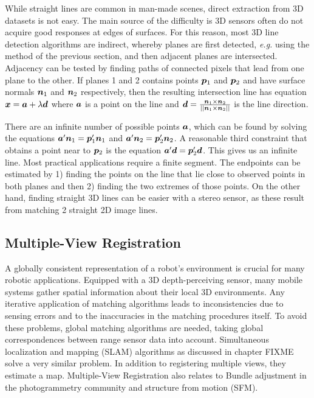 \documentclass[twocolumn,oneside]{book}
\newcommand{\V}[1]{\vector{#1}}  %
\begin{document}
\begin{itemize}
  While straight lines are common in man-made scenes, direct
  extraction from 3D datasets is not easy.  The main source of the
  difficulty is 3D sensors often do not acquire good responses at
  edges of surfaces.
%
  For this reason, most 3D line detection algorithms are indirect,
  whereby planes are first detected, {\it e.g.} using the method of
  the previous section, and then adjacent planes are intersected.
  Adjacency can be tested by finding paths of connected pixels that
  lead from one plane to the other.
%
  If planes 1 and 2 contains points $\V p_1$ and $\V p_2$ and have
  surface normals $\V n_1$ and $\V n_2$ respectively, then the
  resulting intersection line has equation $\V x = \V a + \lambda \V
  d$ where $\V a$ is a point on the line and $\V d = \frac{\V n_1
    \times \V n_2} {\mid\mid \V n_1 \times \V n_2 \mid\mid}$ is the
  line direction.

  There are an infinite number of possible points $\V a$, which can be
  found by solving the equations $\V a' \V n_1 = \V p_1' \V n_1$ and
  $\V a' \V n_2 = \V p_2'\V n_2$. A reasonable third constraint that
  obtains a point near to $\V p_2$ is the equation $\V a' \V d = \V
  p_2' \V d$. This gives us an infinite line. Most practical
  applications require a finite segment. The endpoints can be
  estimated by 1) finding the points on the line that lie close to
  observed points in both planes and then 2) finding the two extremes
  of those points.  On the other hand, finding straight 3D lines can
  be easier with a stereo sensor, as these result from matching 2
  straight 2D image lines.

\end{itemize}

\subsection{Multiple-View Registration\label{match31}}

A globally consistent representation of a robot's environment is
crucial for many robotic applications. Equipped with a 3D
depth-perceiving sensor, many mobile systems gather spatial
information about their local 3D environments. Any iterative
application of matching algorithms leads to inconsistencies due to
sensing errors and to the inaccuracies in the matching procedures
itself. To avoid these problems, global matching algorithms are
needed, taking global correspondences between range sensor data into
account. Simultaneous localization and mapping (SLAM) algorithms as
discussed in chapter FIXME solve a very similar problem. In addition
to registering multiple views, they estimate a map.  Multiple-View
Registration also relates to Bundle adjustment in the photogrammetry
community and structure from motion (SFM).
\end{document}
